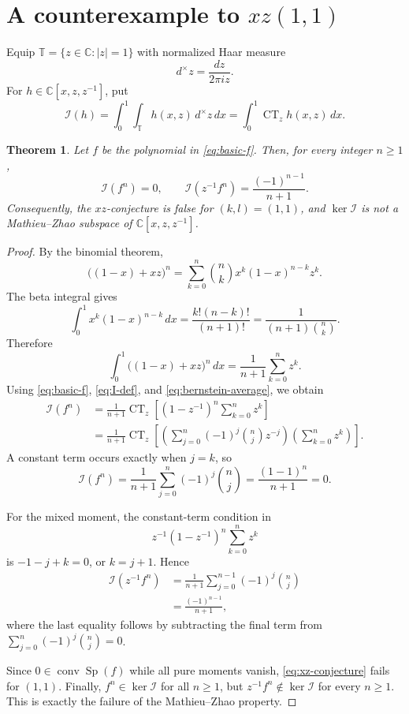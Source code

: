 \documentclass[11pt]{article}
\newcommand{\C}{\mathbb C}
\newcommand{\T}{\mathbb T}
\newcommand{\CT}{\operatorname{CT}}
\newcommand{\Sp}{\operatorname{Sp}}
\newcommand{\I}{\mathcal I}
\newtheorem{theorem}{Theorem}[section]
\theoremstyle{remark}
\begin{document}
\section{A counterexample to \texorpdfstring{$xz(1,1)$}{xz(1,1)}}

Equip $\T=\{z\in\C:|z|=1\}$ with normalized Haar measure
\[
  d^\times z=\frac{dz}{2\pi iz}.
\]
For $h\in\C[x,z,z^{-1}]$, put
\begin{equation}\label{eq:I-def}
  \I(h)
  =\int_0^1\int_{\T}h(x,z)\,d^\times z\,dx
  =\int_0^1\CT_z h(x,z)\,dx.
\end{equation}

\begin{theorem}\label{thm:basic-xz}
Let $f$ be the polynomial in \eqref{eq:basic-f}.  Then, for every integer $n\geq1$,
\begin{equation}\label{eq:basic-moments}
  \I(f^n)=0,
  \qquad
  \I(z^{-1}f^n)=\frac{(-1)^{n-1}}{n+1}.
\end{equation}
Consequently, the $xz$-conjecture is false for $(k,l)=(1,1)$, and $\ker\I$ is not a Mathieu--Zhao subspace of $\C[x,z,z^{-1}]$.
\end{theorem}

\begin{proof}
By the binomial theorem,
\[
  \bigl((1-x)+xz\bigr)^n
  =\sum_{k=0}^n\binom nk x^k(1-x)^{n-k}z^k.
\]
The beta integral gives
\[
  \int_0^1x^k(1-x)^{n-k}\,dx
  =\frac{k!(n-k)!}{(n+1)!}
  =\frac{1}{(n+1)\binom nk}.
\]
Therefore
\begin{equation}\label{eq:bernstein-average}
  \int_0^1\bigl((1-x)+xz\bigr)^n\,dx
  =\frac1{n+1}\sum_{k=0}^n z^k.
\end{equation}
Using \eqref{eq:basic-f}, \eqref{eq:I-def}, and \eqref{eq:bernstein-average}, we obtain
\begin{align*}
  \I(f^n)
  &=\frac1{n+1}\CT_z
    \left[
      (1-z^{-1})^n\sum_{k=0}^n z^k
    \right]\\
  &=\frac1{n+1}\CT_z
    \left[
      \left(\sum_{j=0}^n(-1)^j\binom nj z^{-j}\right)
      \left(\sum_{k=0}^n z^k\right)
    \right].
\end{align*}
A constant term occurs exactly when $j=k$, so
\[
  \I(f^n)
  =\frac1{n+1}\sum_{j=0}^n(-1)^j\binom nj
  =\frac{(1-1)^n}{n+1}=0.
\]

For the mixed moment, the constant-term condition in
\[
  z^{-1}(1-z^{-1})^n\sum_{k=0}^n z^k
\]
is $-1-j+k=0$, or $k=j+1$.  Hence
\begin{align*}
  \I(z^{-1}f^n)
  &=\frac1{n+1}\sum_{j=0}^{n-1}(-1)^j\binom nj\\
  &=\frac{(-1)^{n-1}}{n+1},
\end{align*}
where the last equality follows by subtracting the final term from
$\sum_{j=0}^n(-1)^j\binom nj=0$.

Since $0\in\operatorname{conv}\Sp(f)$ while all pure moments vanish, \eqref{eq:xz-conjecture} fails for $(1,1)$.  Finally, $f^n\in\ker\I$ for all $n\geq1$, but $z^{-1}f^n\notin\ker\I$ for every $n\geq1$.  This is exactly the failure of the Mathieu--Zhao property.
\end{proof}
\end{document}
